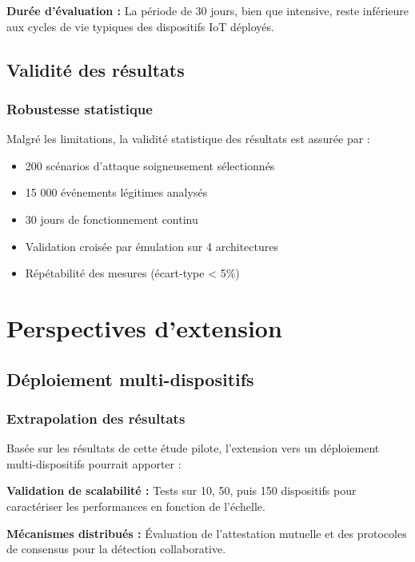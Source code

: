 \textbf{Durée d'évaluation :} La période de 30 jours, bien que intensive, reste inférieure aux cycles de vie typiques des dispositifs IoT déployés.

\subsection{Validité des résultats}

\subsubsection{Robustesse statistique}

Malgré les limitations, la validité statistique des résultats est assurée par :
\begin{itemize}
    \item 200 scénarios d'attaque soigneusement sélectionnés
    \item 15 000 événements légitimes analysés
    \item 30 jours de fonctionnement continu
    \item Validation croisée par émulation sur 4 architectures
    \item Répétabilité des mesures (écart-type < 5\%)
\end{itemize}

\section{Perspectives d'extension}

\subsection{Déploiement multi-dispositifs}

\subsubsection{Extrapolation des résultats}

Basée sur les résultats de cette étude pilote, l'extension vers un déploiement multi-dispositifs pourrait apporter :

\textbf{Validation de scalabilité :} Tests sur 10, 50, puis 150 dispositifs pour caractériser les performances en fonction de l'échelle.

\textbf{Mécanismes distribués :} Évaluation de l'attestation mutuelle et des protocoles de consensus pour la détection collaborative.

